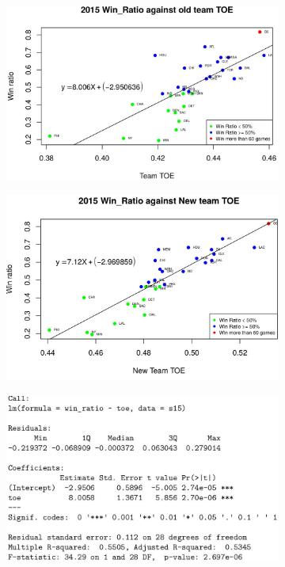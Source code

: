 \documentclass[11pt]{article}
\begin{document}
\begin{figure}[h!]
  \centering
  \begin{subfigure}[b]{0.45\linewidth}
    \includegraphics[width=\linewidth]{15old.jpg}
  \end{subfigure}
  \begin{subfigure}[b]{0.45\linewidth}
    \includegraphics[width=\linewidth]{15new.jpg}
  \end{subfigure}
  \begin{subfigure}[b]{0.42\linewidth}
    \includegraphics[width=\linewidth]{15oldsummary.jpg}

\end{subfigure}
\end{figure}
\end{document}
